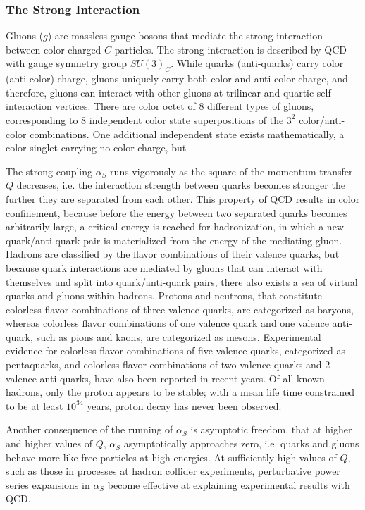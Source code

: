 \subsubsection{The Strong Interaction}
Gluons ($g$) are massless gauge bosons that mediate the strong interaction between color charged $C$ particles.
The strong interaction is described by QCD with gauge symmetry group $SU(3)_C$.
While quarks (anti-quarks) carry color (anti-color) charge, gluons uniquely carry both color and anti-color charge, and therefore, gluons can interact with other gluons at trilinear and quartic self-interaction vertices.
There are color octet of 8 different types of gluons, corresponding to 8 independent color state superpositions of the $3^2$ color/anti-color combinations.
One additional independent state exists mathematically, a color singlet carrying no color charge, but 

The strong coupling $\alpha_S$ runs vigorously as the square of the momentum transfer $Q$ decreases, i.e. the interaction strength between quarks becomes stronger the further they are separated from each other.
This property of QCD results in color confinement, because before the energy between two separated quarks becomes arbitrarily large, a critical energy is reached for hadronization, in which a new quark/anti-quark pair is materialized from the energy of the mediating gluon.
Hadrons are classified by the flavor combinations of their valence quarks, but because quark interactions are mediated by gluons that can interact with themselves and split into quark/anti-quark pairs, there also exists a sea of virtual quarks and gluons within hadrons.
Protons and neutrons, that constitute colorless flavor combinations of three valence quarks, are categorized as baryons, whereas colorless flavor combinations of one valence quark and one valence anti-quark, such as pions and kaons, are categorized as mesons.
Experimental evidence for colorless flavor combinations of five valence quarks, categorized as pentaquarks, and colorless flavor combinations of two valence quarks and 2 valence anti-quarks, have also been reported in recent years.
Of all known hadrons, only the proton appears to be stable; with a mean life time constrained to be at least $10^34$ years, proton decay has never been observed.

Another consequence of the running of $\alpha_S$ is asymptotic freedom, that at higher and higher values of $Q$, $\alpha_S$ asymptotically approaches zero, i.e. quarks and gluons behave more like free particles at high energies.
At sufficiently high values of $Q$, such as those in processes at hadron collider experiments, perturbative power series expansions in $\alpha_S$ become effective at explaining experimental results with QCD.

